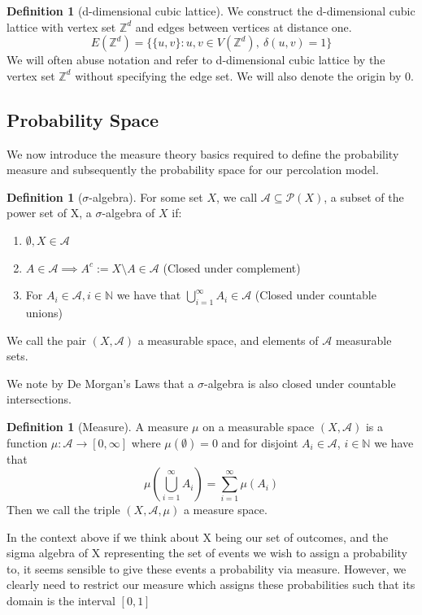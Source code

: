 \documentclass[a4paper,11pt]{article}
\theoremstyle{definition}
\newtheorem{definition}[theorem]{Definition}
\newcommand{\ints}{\mathbb{Z}}
\begin{document}
\begin{definition}[d-dimensional cubic lattice]{
	We construct the d-dimensional cubic lattice with vertex set $\ints^d$ and edges between vertices at distance one.
	$$E(\ints^d) = \{\{u,v\}:u,v \in V(\ints^d),\: \delta(u,v) = 1\}$$
	We will often abuse notation and refer to d-dimensional cubic lattice by the vertex set $\ints^d$ without specifying the edge set.
	We will also denote the origin by $0$.
}
\end{definition}


\subsection{Probability Space}

We now introduce the measure theory basics required to define the probability measure and subsequently the probability space for our percolation model.

\begin{definition}[$\sigma$-algebra]
	For some set $X$, we call $\mathcal{A} \subseteq \mathcal{P}(X)$, a subset of the power set of X, a  $\sigma$-algebra of $X$ if:
	\begin{enumerate}
		\item $\emptyset,X \in \mathcal{A}$
		\item $A \in \mathcal{A} \implies A^c := X \setminus A \in \mathcal{A}$ (Closed under complement)
		\item For $A_i \in \mathcal{A}, i \in \mathbb{N}$ we have that $\bigcup^\infty_{i=1} A_i \in \mathcal{A}$ (Closed under countable unions)
	\end{enumerate}
	We call the pair $(X,\mathcal{A})$ a measurable space, and elements of $\mathcal{A}$ measurable sets.
\end{definition}

We note by De Morgan's Laws that a $\sigma$-algebra is also closed under countable intersections.

\begin{definition}[Measure]
	A measure $\mu$ on a measurable space $(X,\mathcal{A})$ is a function $\mu: \mathcal{A} \rightarrow [0,\infty]$ where 
	$\mu(\emptyset) = 0 $ and for disjoint $A_i \in \mathcal{A}$, $i \in \mathbb{N}$ we have that
	$$ \mu\left(\bigcup^\infty_{i=1} A_i\right) = \sum_{i = 1}^{\infty} \mu(A_i)  $$
	Then we call the triple $(X,\mathcal{A},\mu)$ a measure space.
\end{definition}

In the context above if we think about X being our set of outcomes, and the sigma algebra of X representing the set of events we wish to assign a probability to, it seems sensible to give these events a probability via measure. 
However, we clearly need to restrict our measure which assigns these probabilities such that its domain is the interval $[0,1]$ 
\end{document}
